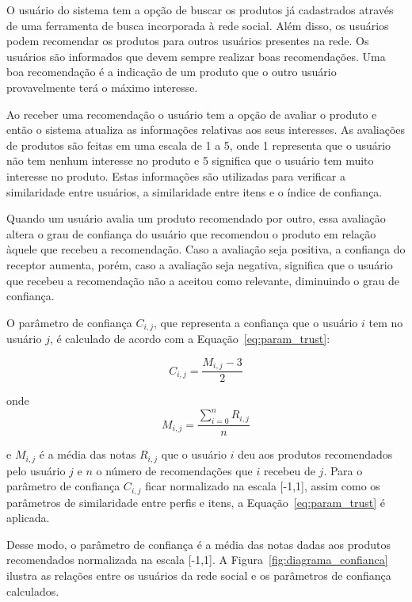   O usuário do sistema tem a opção de buscar os produtos já cadastrados através de uma ferramenta de busca incorporada à rede social. Além disso, os usuários podem recomendar os produtos para outros usuários presentes na rede. Os usuários são informados que devem sempre realizar boas recomendações. Uma boa recomendação é a indicação de um produto que o outro usuário provavelmente terá o máximo interesse.

 Ao receber uma recomendação o usuário tem a opção de avaliar o produto e então o sistema atualiza as informações relativas aos seus interesses. As avaliações de produtos são feitas em uma escala de 1 a 5, onde 1 representa que o usuário não tem nenhum interesse no produto e 5 significa que o usuário tem muito interesse no produto. Estas informações são utilizadas para verificar a similaridade entre usuários, a similaridade entre itens e o índice de confiança.
 
 Quando um usuário avalia um produto recomendado por outro, essa avaliação altera o grau de confiança do usuário que recomendou o produto em relação àquele que recebeu a recomendação. Caso a avaliação seja positiva, a confiança do receptor aumenta, porém, caso a avaliação seja negativa, significa que o usuário que recebeu a recomendação não a aceitou como relevante, diminuindo o grau de confiança.

 O parâmetro de confiança $C_{i,j}$, que representa a confiança que o usuário $i$ tem no usuário $j$, é calculado de acordo com a Equação~\ref{eq:param_trust}:
 
\begin{equation}
 C_{i,j} = \frac{M_{i,j} - 3}{2}
 \label{eq:param_trust} 
\end{equation}

 onde
\begin{equation}
 M_{i,j} = \frac{{\sum_{i=0}^n}R_{i,j}}{n}
 \label{eq:media_notas}
\end{equation}

 e $M_{i,j}$ é a média das notas $R_{i,j}$ que o usuário $i$ deu aos produtos recomendados pelo usuário $j$ e $n$ o número de recomendações que $i$ recebeu de $j$. Para o parâmetro de confiança $C_{i,j}$ ficar normalizado na escala [-1,1], assim como os parâmetros de similaridade entre perfis e itens, a Equação~\ref{eq:param_trust} é aplicada.

 Desse modo, o parâmetro de confiança é a média das notas dadas aos produtos recomendados normalizada na escala [-1,1]. A Figura~\ref{fig:diagrama_confianca} ilustra as relações entre os usuários da rede social e os parâmetros de confiança calculados.
 
